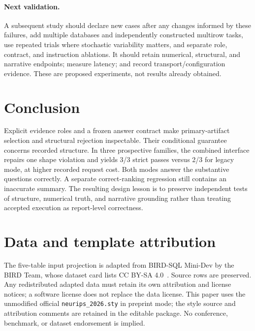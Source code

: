 \documentclass{article}
\newcommand{\code}[1]{\texttt{#1}}
\begin{document}
\paragraph{Next validation.} A subsequent study should declare new cases after any changes informed by these failures, add multiple databases and independently constructed multirow tasks, use repeated trials where stochastic variability matters, and separate role, contract, and instruction ablations. It should retain numerical, structural, and narrative endpoints; measure latency; and record transport/configuration evidence. These are proposed experiments, not results already obtained.

\section{Conclusion}
Explicit evidence roles and a frozen answer contract make primary-artifact selection and structural rejection inspectable. Their conditional guarantee concerns recorded structure. In three prospective families, the combined interface repairs one shape violation and yields 3/3 strict passes versus 2/3 for legacy mode, at higher recorded request cost. Both modes answer the substantive questions correctly. A separate correct-ranking regression still contains an inaccurate summary. The resulting design lesson is to preserve independent tests of structure, numerical truth, and narrative grounding rather than treating accepted execution as report-level correctness.

\section*{Data and template attribution}
The five-table input projection is adapted from BIRD-SQL Mini-Dev by the BIRD Team, whose dataset card lists CC BY-SA 4.0~\citep{birdminidev,ccbysa}. Source rows are preserved. Any redistributed adapted data must retain its own attribution and license notices; a software license does not replace the data license. This paper uses the unmodified official \code{neurips\_2026.sty} in preprint mode; the style source and attribution comments are retained in the editable package. No conference, benchmark, or dataset endorsement is implied.
\end{document}

